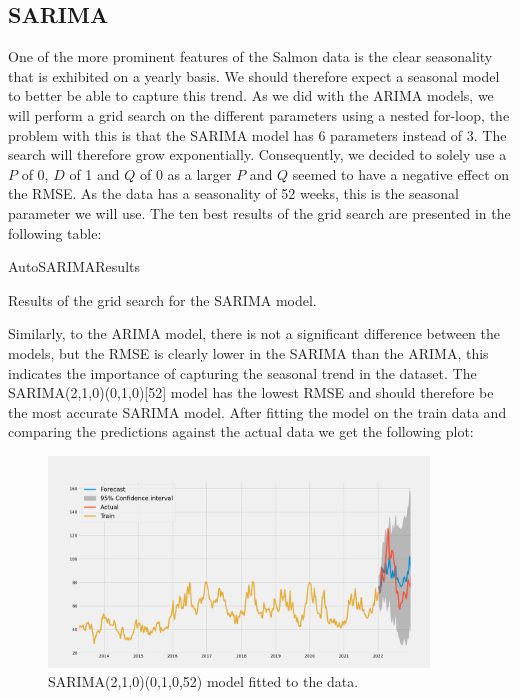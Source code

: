 \subsection{SARIMA}\label{sec:sarima}
One of the more prominent features of the Salmon data is the clear seasonality that is exhibited on a yearly basis. We should therefore expect a seasonal model to better be able to capture this trend. As we did with the ARIMA models, we will perform a grid search on the different parameters using a nested for-loop, the problem with this is that the SARIMA model has 6 parameters instead of 3. The search will therefore grow exponentially. Consequently, we decided to solely use a $P$ of 0, $D$ of 1 and $Q$ of 0 as a larger $P$ and $Q$ seemed to have a negative effect on the RMSE. As the data has a seasonality of 52 weeks, this is the seasonal parameter we will use. The ten best results of the grid search are presented in the following table:
\begin{table}[H]
    \begin{center}
        {AutoSARIMAResults}
        \caption{Results of the grid search for the SARIMA model.}\label{tab:SARIMAResults}
    \end{center}
\end{table}
Similarly, to the ARIMA model, there is not a significant difference between the models, but the RMSE is clearly lower in the SARIMA than the ARIMA, this indicates the importance of capturing the seasonal trend in the dataset. The SARIMA(2,1,0)(0,1,0)[52] model has the lowest RMSE and should therefore be the most accurate SARIMA model. After fitting the model on the train data and comparing the predictions against the actual data we get the following plot:
\begin{figure}[H]
    \begin{center}
        \includegraphics[width=0.9\textwidth]{data/Figures/ARIMA/SARIMA_2_1_0_0_1_0_52.png}
        \caption{SARIMA(2,1,0)(0,1,0,52) model fitted to the data.}\label{fig:SARIMA_21001052}
    \end{center}
\end{figure}
